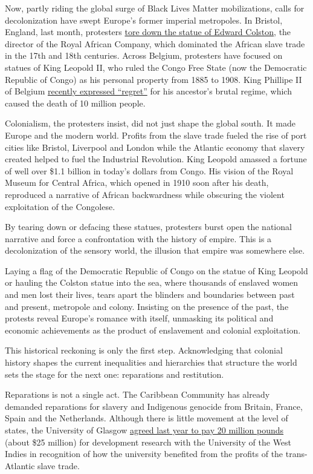 Now, partly riding the global surge of Black Lives Matter mobilizations,
calls for decolonization have swept Europe's former imperial metropoles.
In Bristol, England, last month, protesters
\href{https://www.nytimes3xbfgragh.onion/2020/06/12/opinion/edward-colston-statue-racism.html}{tore
down the statue of Edward Colston}, the director of the Royal African
Company, which dominated the African slave trade in the 17th and 18th
centuries. Across Belgium, protesters have focused on statues of King
Leopold II, who ruled the Congo Free State (now the Democratic Republic
of Congo) as his personal property from 1885 to 1908. King Phillipe II
of Belgium
\href{https://www.nytimes3xbfgragh.onion/2020/06/30/world/europe/belgium-king-congo.html}{recently
expressed ``regret''} for his ancestor's brutal regime, which caused the
death of 10 million people.

Colonialism, the protesters insist, did not just shape the global south.
It made Europe and the modern world. Profits from the slave trade fueled
the rise of port cities like Bristol, Liverpool and London while the
Atlantic economy that slavery created helped to fuel the Industrial
Revolution. King Leopold amassed a fortune of well over \$1.1 billion in
today's dollars from Congo. His vision of the Royal Museum for Central
Africa, which opened in 1910 soon after his death, reproduced a
narrative of African backwardness while obscuring the violent
exploitation of the Congolese.

By tearing down or defacing these statues, protesters burst open the
national narrative and force a confrontation with the history of empire.
This is a decolonization of the sensory world, the illusion that empire
was somewhere else.

Laying a flag of the Democratic Republic of Congo on the statue of King
Leopold or hauling the Colston statue into the sea, where thousands of
enslaved women and men lost their lives, tears apart the blinders and
boundaries between past and present, metropole and colony. Insisting on
the presence of the past, the protests reveal Europe's romance with
itself, unmasking its political and economic achievements as the product
of enslavement and colonial exploitation.

This historical reckoning is only the first step. Acknowledging that
colonial history shapes the current inequalities and hierarchies that
structure the world sets the stage for the next one: reparations and
restitution.

Reparations is not a single act. The Caribbean Community has already
demanded reparations for slavery and Indigenous genocide from Britain,
France, Spain and the Netherlands. Although there is little movement at
the level of states, the University of Glasgow
\href{https://www.theguardian.com/uk-news/2019/aug/23/glasgow-university-slave-trade-reparations}{agreed
last year to pay 20 million pounds} (about \$25 million) for development
research with the University of the West Indies in recognition of how
the university benefited from the profits of the trans-Atlantic slave
trade.

